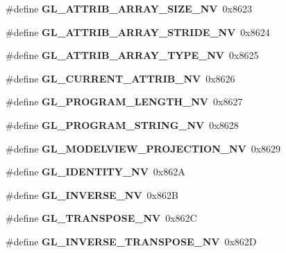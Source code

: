 \begin{DoxyCompactItemize}
\item 
\#define {\bfseries G\+L\+\_\+\+A\+T\+T\+R\+I\+B\+\_\+\+A\+R\+R\+A\+Y\+\_\+\+S\+I\+Z\+E\+\_\+\+N\+V}~0x8623\label{_s_d_l__opengl_8h_acab0475dba9943e0f97b5d992194e2bd}

\item 
\#define {\bfseries G\+L\+\_\+\+A\+T\+T\+R\+I\+B\+\_\+\+A\+R\+R\+A\+Y\+\_\+\+S\+T\+R\+I\+D\+E\+\_\+\+N\+V}~0x8624\label{_s_d_l__opengl_8h_a06ed303f8a6114fc221770ef9e7b4b20}

\item 
\#define {\bfseries G\+L\+\_\+\+A\+T\+T\+R\+I\+B\+\_\+\+A\+R\+R\+A\+Y\+\_\+\+T\+Y\+P\+E\+\_\+\+N\+V}~0x8625\label{_s_d_l__opengl_8h_af9bb2b993fb601e83d8d204a294a4e58}

\item 
\#define {\bfseries G\+L\+\_\+\+C\+U\+R\+R\+E\+N\+T\+\_\+\+A\+T\+T\+R\+I\+B\+\_\+\+N\+V}~0x8626\label{_s_d_l__opengl_8h_a6141718b8526c4b10e631bc03ced2dd2}

\item 
\#define {\bfseries G\+L\+\_\+\+P\+R\+O\+G\+R\+A\+M\+\_\+\+L\+E\+N\+G\+T\+H\+\_\+\+N\+V}~0x8627\label{_s_d_l__opengl_8h_a8c6825010eed07eadfa291d96c1c6787}

\item 
\#define {\bfseries G\+L\+\_\+\+P\+R\+O\+G\+R\+A\+M\+\_\+\+S\+T\+R\+I\+N\+G\+\_\+\+N\+V}~0x8628\label{_s_d_l__opengl_8h_ad38b2a0dcd3ae914ec54d2904c05c066}

\item 
\#define {\bfseries G\+L\+\_\+\+M\+O\+D\+E\+L\+V\+I\+E\+W\+\_\+\+P\+R\+O\+J\+E\+C\+T\+I\+O\+N\+\_\+\+N\+V}~0x8629\label{_s_d_l__opengl_8h_adedfe2d8118aa41acd21b77c549d17a7}

\item 
\#define {\bfseries G\+L\+\_\+\+I\+D\+E\+N\+T\+I\+T\+Y\+\_\+\+N\+V}~0x862\+A\label{_s_d_l__opengl_8h_aed38ef7d3b31290feb616105633a5281}

\item 
\#define {\bfseries G\+L\+\_\+\+I\+N\+V\+E\+R\+S\+E\+\_\+\+N\+V}~0x862\+B\label{_s_d_l__opengl_8h_a68b2ee52e4d9e41ad25c0aad51fa9bae}

\item 
\#define {\bfseries G\+L\+\_\+\+T\+R\+A\+N\+S\+P\+O\+S\+E\+\_\+\+N\+V}~0x862\+C\label{_s_d_l__opengl_8h_aa332af8be4d7a375070c992e3d93cdfe}

\item 
\#define {\bfseries G\+L\+\_\+\+I\+N\+V\+E\+R\+S\+E\+\_\+\+T\+R\+A\+N\+S\+P\+O\+S\+E\+\_\+\+N\+V}~0x862\+D\label{_s_d_l__opengl_8h_a089b2b6e7ff5b82c321cf52bc8bbcab4}


\end{DoxyCompactItemize}
